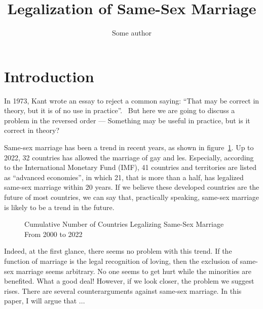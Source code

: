 \documentclass{article}
\title{Legalization of Same-Sex Marriage}
\author{Some author}
\begin{document}
\maketitle
\newpage
\tableofcontents
\newpage
\section{Introduction}
In 1973, Kant wrote an essay to reject a common saying: ``That may be correct in theory, but it is of no use in practice''.~\autocite{kantCommonSayingThat2009} But here we are going to discuss a problem in the reversed order --- Something may be useful in practice, but is it correct in theory? 

Same-sex marriage has been a trend in recent years, as shown in figure~\ref{Cumu}. Up to 2022, 32 countries has allowed the marriage of gay and les. Especially, according to the International Monetary Fund (IMF), 41 countries and territories are listed as ``advanced economies'', in which 21, that is more than a half, has legalized same-sex marriage within 20 years. If we believe these developed countries are the future of most countries, we can say that, practically speaking, same-sex marriage is likely to be a trend in the future.


\begin{figure}[H]
    \centering
        
    \caption{Cumulative Number of Countries Legalizing Same-Sex Marriage From 2000 to 2022~\autocite{perper32CountriesWorld2022}}
    \label{Cumu}
\end{figure}
    

Indeed, at the first glance, there seems no problem with this trend. If the function of marriage is the legal recognition of loving, then the exclusion of same-sex marriage seems arbitrary. No one seems to get hurt while the minorities are benefited. What a good deal! However, if we look closer, the problem we suggest rises. There are several counterarguments against same-sex marriage. In this paper, I will argue that ...
\end{document}
